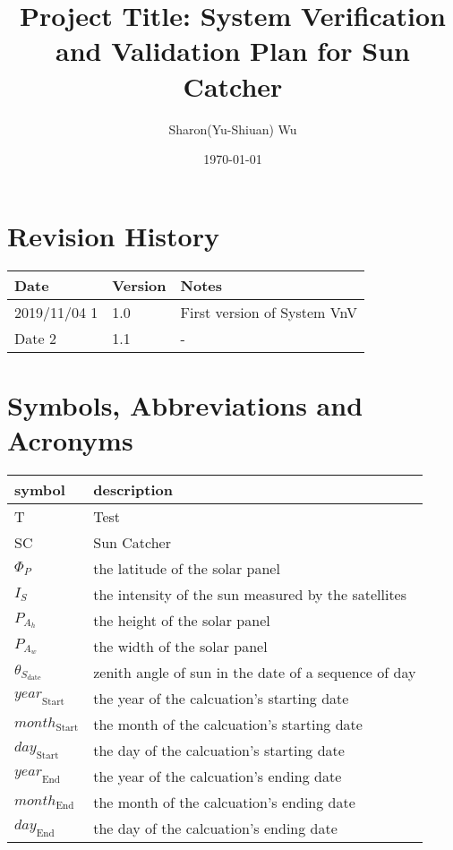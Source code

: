 \documentclass[12pt, titlepage]{article}
\begin{document}
\title{Project Title: System Verification and Validation Plan for Sun Catcher}

\author{Sharon(Yu-Shiuan) Wu} \date{\today} \maketitle
{}

\section{Revision History}

\begin{tabularx}{\textwidth}{p{3cm}p{2cm}X}
\toprule {\bf Date} & {\bf Version} & {\bf Notes}\\ 
\midrule 
2019/11/04 1 & 1.0 & First version of System VnV\\ 
Date 2 & 1.1 & -\\ 
\bottomrule 
\end{tabularx} \newpage
\tableofcontents

\listoftables

\listoffigures

\newpage

\section{Symbols, Abbreviations and Acronyms}

\renewcommand{\arraystretch}{1.2}
\begin{tabular}{l l} \toprule \textbf{symbol} & \textbf{description}\\
 \midrule T & Test\\ 
SC & Sun Catcher\\ 
$\Phi_P$ & the latitude of the solar panel \\ 
$I_{S}$ &  the intensity of the sun measured by the satellites \\ 
$P_{A_{h}}$ & the height of the solar panel \\ 
$P_{A_{w}}$ & the width of the solar panel \\
$\theta_{S_{\text{date}}}$ & zenith angle of
sun in the date of a sequence of day
  \\ 
$\mathit{year}_\text{Start}$ & the year of the calcuation's starting date\\ 
$\mathit{month}_\text{Start}$ & the month of the calcuation's starting date\\ 
$\mathit{day}_\text{Start}$ & the day of the calcuation's starting date\\ 
$\mathit{year}_\text{End}$ & the year of the calcuation's ending date\\ 
$\mathit{month}_\text{End}$ & the month of the calcuation's ending date\\ 
$\mathit{day}_\text{End}$ & the day of the calcuation's ending date\\ 
\bottomrule
\end{tabular}\\ 
\end{document}
